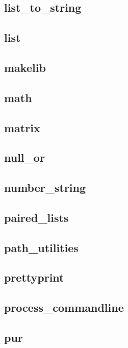 \subsection{list\_to\_string}					
\subsection{list}	                        		
\subsection{makelib}						
\subsection{math}						
\subsection{matrix}						
\subsection{null\_or}						
\subsection{number\_string}					
\subsection{paired\_lists}					
\subsection{path\_utilities}					
\subsection{prettyprint}					
\subsection{process\_commandline}				
\subsection{pur}						
